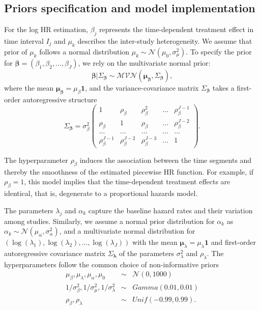 \documentclass[12pt]{article}
\theoremstyle{mystyle}
\begin{document}
\subsection{Priors specification and model implementation}
\label{subsec:4:4} 

For the log HR estimation, $\beta_j$ represents the time-dependent treatment effect in time interval $I_j$ and $\mu_k$ describes the inter-study heterogeneity. We assume that prior of $\mu_k$ follows a normal distribution $\mu_k \sim  \mathcal N(\mu_0,\sigma_\mu^2)$. 
To specify the prior for $\boldsymbol\beta=(\beta_1,\beta_2,\dots,\beta_J)$, we rely on the multivariate normal prior: $$\boldsymbol\beta | \Sigma_{\boldsymbol\beta} \sim \mathcal{MVN}(\boldsymbol{\mu_\beta},{\Sigma_{\boldsymbol\beta}}),$$
where the mean $\boldsymbol{\mu_\beta}=\mu_\beta \mathbf{1}$, and the variance-covariance matrix $\Sigma_{\boldsymbol\beta}$ takes a first-order autoregressive structure
\begin{equation*}
\Sigma_{\boldsymbol\beta}=\sigma_\beta^2 \begin{pmatrix}
1 & \rho_\beta & \rho_\beta^2 & \dots & \rho_\beta^{J-1}\\
\rho_\beta & 1 & \rho_\beta & \dots & \rho_\beta^{J-2}\\
\dots & \dots & \dots & \dots & \dots \\
\rho_\beta^{J-1} & \rho_\beta^{J-2} & \rho_\beta^{J-3} & \dots & 1
\end{pmatrix}.
\end{equation*} 

The hyperparameter $\rho_\beta$ induces the association between the time segments and thereby the smoothness of the estimated piecewise HR function. For example, if $\rho_\beta=1$, this model implies that the time-dependent treatment effects are identical, that is, degenerate to a proportional hazards model.

The parameters $\lambda_j$ and $\alpha_k$ capture the baseline hazard rates and their variation among studies. Similarly, we assume a normal prior distribution for $\alpha_k$ as $\alpha_k\sim \mathcal N(\mu_\alpha,\sigma_\alpha^2)$, and a multivariate normal distribution for $(\log(\lambda_1),\log(\lambda_2),\dots,\log(\lambda_J))$ with the mean $\boldsymbol\mu_\lambda =\mu_\lambda \mathbf{1}$ and first-order autoregressive covariance matrix $\Sigma_{\boldsymbol\lambda}$ of the parameters $\sigma_\lambda^2$ and $\rho_\lambda$.  The hyperparameters follow the common choice of non-informative priors 
\begin{eqnarray*}
\mu_\beta,\mu_\lambda,\mu_\alpha,\mu_0 & \sim & \mathcal N(0,1000)\\
1/\sigma_\beta^2,1/\sigma_\mu^2,1/\sigma_\lambda^2 & \sim &  Gamma(0.01,0.01)\\
 \rho_\beta, \rho_\lambda & \sim &   Unif(-0.99,0.99).
\end{eqnarray*} 
\end{document}
